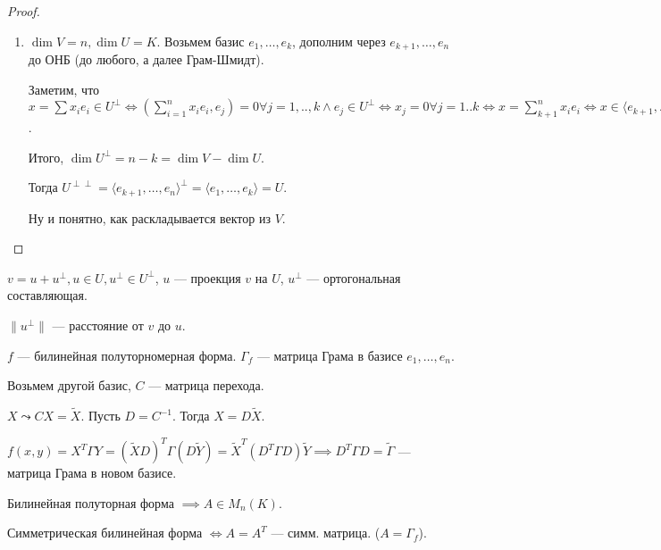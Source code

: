 \begin{proof}
     \slashn
     \begin{enumerate}
         \item $\dim V = n, \dim U = K$. Возьмем базис $e_1, \ldots, e_k$, дополним через $e_{k+1}, \ldots, e_n$ до ОНБ (до любого, а далее Грам-Шмидт).

             Заметим, что $x = \sum x_ie_i \in U^{\perp} \iff (\sum\limits_{i=1}^n x_ie_i, e_j) = 0 \forall j=1,..,k \land e_j \in U^{\perp} \iff x_j = 0 \forall j=1..k \iff x = \sum\limits_{k+1}^n x_ie_i \iff x \in \langle e_{k+1}, \ldots, e_n \rangle$.

            Итого, $\dim U^\perp = n - k = \dim V - \dim U$.

            Тогда  $U^{\perp\perp} = \langle e_{k+1}, \ldots, e_n \rangle ^{\perp} = \langle e_1, \ldots, e_k \rangle = U$. 

            Ну и понятно, как раскладывается вектор из $V$.
     \end{enumerate}
 \end{proof}
 \begin{definition}
     $v = u+u^{\perp}, u \in U, u^{\perp} \in U^{\perp}$,  $u$ --- проекция  $v$ на  $U$, $u^\perp$ --- ортогональная составляющая.

     $\|u^{\perp}\|$ --- расстояние от $v$ до  $u$.
 \end{definition}
 \begin{statement}
     $f$ --- билинейная полуторномерная форма.  $\Gamma_f$ --- матрица Грама в базисе  $e_1, \ldots, e_n$.

     Возьмем другой базис, $C$ --- матрица перехода.

     $X \leadsto C X = \widetilde{X}$. Пусть  $D = C^{-1}$. Тогда  $X = D\widetilde{X}$.

     $f(x, y) = X^T\Gamma Y = (\widetilde{X}D)^T\Gamma (D\widetilde{Y})= \widetilde{X}^{T} (D^T\Gamma D)\widetilde{Y} \implies D^T\Gamma D = \widetilde{\Gamma}$ --- матрица Грама в новом базисе.
 \end{statement}

 Билинейная полуторная форма $\implies A \in M_n(K)$.

 Симметрическая билинейная форма  $\iff A = A^T$ --- симм. матрица. ($A = \Gamma_f$).

